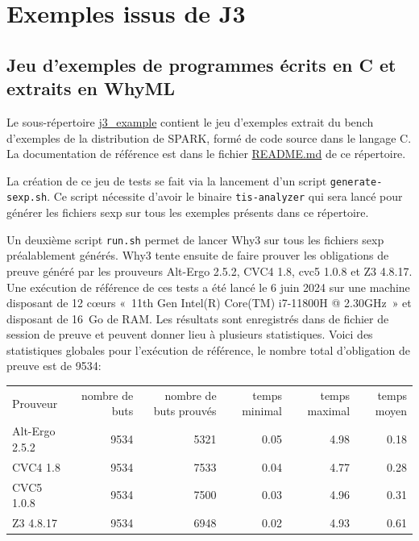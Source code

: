 \documentclass[a4paper,11pt]{article}
\begin{document}
\section{Exemples issus de J3}

\subsection{Jeu d'exemples de programmes écrits en C et extraits en WhyML}

Le sous-répertoire \url{j3_example} contient le jeu d'exemples extrait du bench
d'exemples de la distribution de SPARK, formé de code source dans le langage C.
La documentation de référence est dans le fichier \url{README.md} de ce
répertoire.

La création de ce jeu de tests se fait via la lancement d'un script
\verb/generate-sexp.sh/.
Ce script nécessite d'avoir le binaire \verb/tis-analyzer/ qui sera lancé
pour générer les fichiers sexp sur tous les exemples présents dans ce
répertoire.

Un deuxième script \verb/run.sh/ permet de lancer Why3 sur tous les fichiers
sexp préalablement générés. Why3 tente ensuite de faire prouver les obligations
de preuve généré par les prouveurs Alt-Ergo 2.5.2, CVC4 1.8, cvc5 1.0.8 et
Z3 4.8.17. Une exécution de référence de ces tests a été lancé le 6 juin 2024
sur une machine disposant de 12 c{\oe}urs «~11th Gen Intel(R) Core(TM) i7-11800H @ 2.30GHz~» et disposant de 16~Go de RAM.
Les résultats sont enregistrés dans de fichier de session de preuve et peuvent
donner lieu à plusieurs statistiques.
Voici des statistiques globales pour l'exécution de
référence, le nombre total d'obligation de preuve est de 9534:

\begin{center}
  \begin{tabular}{|l|r|r|r|r|r|}
    \hline
  \rowcolor{gray!50} Prouveur
  & \multicolumn{1}{p{0.13\textwidth}|}{nombre de buts}
  & \multicolumn{1}{p{0.13\textwidth}|}{nombre de buts prouvés}
  & \multicolumn{1}{p{0.13\textwidth}|}{temps minimal}
  & \multicolumn{1}{p{0.13\textwidth}|}{temps maximal}
  & \multicolumn{1}{p{0.13\textwidth}|}{temps moyen}
  \\
  Alt-Ergo 2.5.2                &  9534 & 5321 & 0.05 & 4.98 & 0.18 \\
  CVC4 1.8                      &  9534 & 7533 & 0.04 & 4.77 & 0.28 \\
  CVC5 1.0.8                    &  9534 & 7500 & 0.03 & 4.96 & 0.31 \\
  Z3 4.8.17                     &  9534 & 6948 & 0.02 & 4.93 & 0.61 \\
    \hline
\end{tabular}
\end{center}
\end{document}
